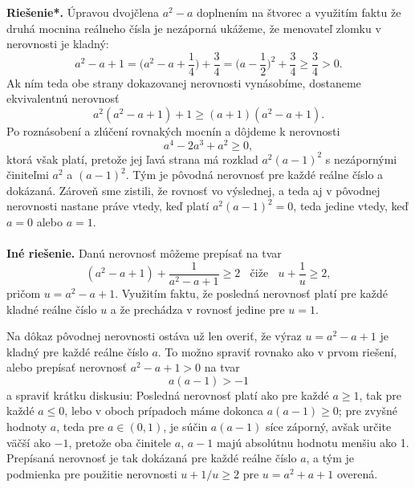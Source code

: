 \documentclass[11pt,a4paper,oneside,final]{book}
\newcommand{\rieh}{\textbf{Riešenie*.} }
\begin{document}
\rieh Úpravou dvojčlena $a^2 - a$ doplnením na štvorec a využitím faktu že druhá mocnina reálneho čísla je nezáporná ukážeme, že menovateľ zlomku v nerovnosti je kladný:
$$a^2-a+1=\bigg(a^2-a+\frac{1}{4}\bigg) +\frac{3}{4}=\bigg(a-\frac{1}{2}\bigg)^2+\frac{3}{4}\geq \frac{3}{4}>0.$$
Ak ním teda obe strany dokazovanej nerovnosti vynásobíme, dostaneme ekvivalentnú nerovnosť
$$a^2(a^2-a+1)+1\geq (a+1)(a^2-a+1).$$
Po roznásobení a zlúčení rovnakých mocnín a dôjdeme k nerovnosti
$$ a^4-2a^3+a^2\geq 0,$$
ktorá však platí, pretože jej ľavá strana má rozklad $a^2 (a - 1)^2$ s nezápornými činiteľmi $a^2$ a $(a - 1)^2$. Tým je pôvodná nerovnosť pre každé reálne číslo a dokázaná. Zároveň sme zistili, že rovnosť vo výslednej, a teda aj v pôvodnej nerovnosti nastane práve vtedy, keď platí $a^2 (a - 1)^2 = 0$, teda jedine vtedy, keď $a = 0$ alebo $a = 1$.\\
\\
\textbf{Iné riešenie.} Danú nerovnosť môžeme prepísať na tvar $$ (a^2 - a + 1) + \frac{1}{a^2-a+1}\geq 2 \ \ \ \ \text{čiže} \ \ \ \  u +\frac{1}{u}\geq 2,$$ pričom $u = a^2 -a + 1$. Využitím faktu, že posledná nerovnosť platí pre každé kladné
reálne číslo $u$ a že prechádza v rovnosť jedine pre $u = 1$.

Na dôkaz pôvodnej nerovnosti ostáva už len overiť, že výraz $u = a^2 - a + 1$ je kladný pre každé reálne číslo $a$. To možno spraviť rovnako ako v prvom riešení, alebo prepísať nerovnosť $a^2 - a + 1 > 0$ na tvar $$a(a -1) > -1$$ a spraviť krátku diskusiu: Posledná nerovnosť platí ako pre každé $a \geq 1$, tak pre každé $a\leq 0$, lebo v oboch prípadoch máme dokonca $a(a - 1) \geq 0$; pre zvyšné hodnoty $a$, teda pre $a \in (0, 1)$, je súčin $a(a - 1)$ síce záporný, avšak určite väčší ako $-1$, pretože oba činitele $a$, $a - 1$ majú absolútnu hodnotu menšiu ako 1. Prepísaná nerovnosť je
tak dokázaná pre každé reálne číslo $a$, a tým je podmienka pre použitie nerovnosti $u + 1/u \geq 2$ pre $u = a^2 + a + 1$ overená.
\end{document}
